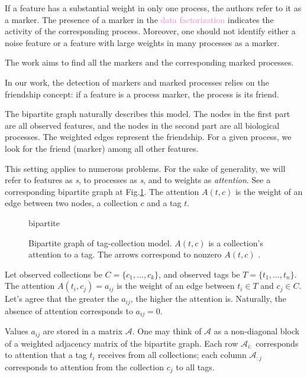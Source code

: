 \documentclass{llncs}
\begin{document}

If a feature has a substantial weight in only one process, the authors \cite{stein-obrien_patternmarkers_2017} refer to it as a marker. 
The presence of a marker in the \textcolor{violet}{data factorization} indicates the activity of the corresponding process. Moreover, one should not identify either a noise feature or a feature with large weights in many processes as a marker.

The work \cite{stein-obrien_patternmarkers_2017} aims to find all the markers and the corresponding marked processes.  

In our work, the detection of markers and marked processes relies on the friendship concept:
if a feature is a process marker, the process is its friend. 

The bipartite graph naturally describes this model. The nodes in the first part are all observed features, and the nodes in the second part are all biological processes. The weighted edges represent the friendship.
For a given process, we look for the friend (marker) among all other features.

This setting applies to numerous problems. For the sake of generality, we will refer to features as \textit{{\tag}s}, to processes as \textit{{\collection}s}, and to weights as \textit{attention}. See a corresponding bipartite graph at Fig.\ref{fig:nice_name}.  The attention $A(t, c)$ is the weight of an edge between two nodes, a collection $c$ and a tag $t$.

\begin{figure}
    \centering
    {bipartite}
    \caption{Bipartite graph of tag-collection model. $A(t,c)$ is a collection's attention to a tag. The arrows correspond to nonzero $A(t,c)$ .}
    \label{fig:nice_name}
\end{figure}

Let observed collections be $C = \{c_1, \dots, c_k\}$, and observed tags be $T = \{t_1, \dots, t_n\}$.
The attention $A(t_i, c_j) = a_{ij}$ is the weight of an edge between $t_i \in T$ and $c_j \in C$.
Let's agree that the greater the $a_{ij}$, the higher the attention is. Naturally, the absence of attention corresponds to $a_{ij} = 0$. 

Values $a_{ij}$ are stored in a matrix $\mathcal{A}$. One may think of $\mathcal{A}$ as a non-diagonal block of a weighted adjacency matrix of the bipartite graph. Each row $\mathcal{A}_{i:}$ corresponds to attention that a tag $t_i$ receives from all collections; each column $\mathcal{A}_{:j}$ corresponds to attention from the collection $c_j$ to all tags.
\end{document}
